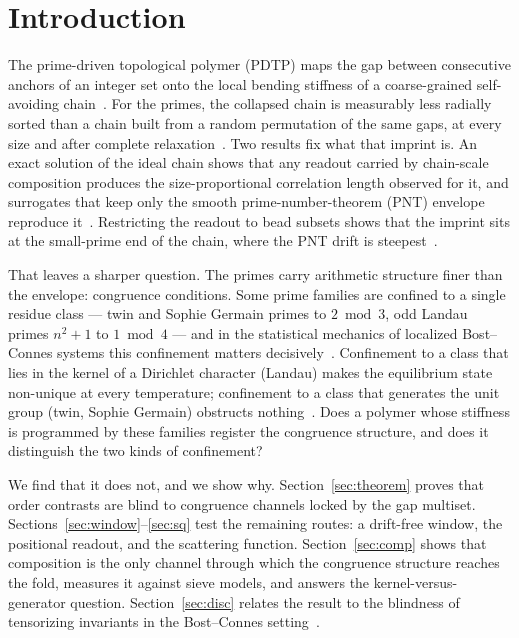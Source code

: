 \documentclass[reprint,amsmath,amssymb,aps,pre,longbibliography]{revtex4-2}
\begin{document}
\maketitle

\section{Introduction}

The prime-driven topological polymer (PDTP) maps the gap between consecutive anchors of an
integer set onto the local bending stiffness of a coarse-grained self-avoiding
chain~\cite{PDTP4}. For the primes, the collapsed chain is measurably less radially sorted than
a chain built from a random permutation of the same gaps, at every size and after complete
relaxation~\cite{PDTP4,Merged}. Two results fix what that imprint is. An exact solution of the
ideal chain shows that any readout carried by chain-scale composition produces the
size-proportional correlation length observed for it, and surrogates that keep only the smooth
prime-number-theorem (PNT) envelope reproduce it~\cite{Merged}. Restricting the readout to bead
subsets shows that the imprint sits at the small-prime end of the chain, where the PNT drift is
steepest~\cite{PDTP4}.

That leaves a sharper question. The primes carry arithmetic structure finer than the envelope:
congruence conditions. Some prime families are confined to a single residue class --- twin and
Sophie Germain primes to $2\bmod3$, odd Landau primes $n^2+1$ to $1\bmod4$ --- and in the
statistical mechanics of localized Bost--Connes systems this confinement matters
decisively~\cite{LBCS,BostConnes}. Confinement to a class that lies in the kernel of a Dirichlet
character (Landau) makes the equilibrium state non-unique at every temperature; confinement to a
class that generates the unit group (twin, Sophie Germain) obstructs nothing~\cite[Ch.~37]{LBCS}.
Does a polymer whose stiffness is programmed by these families register the congruence
structure, and does it distinguish the two kinds of confinement?

We find that it does not, and we show why. Section~\ref{sec:theorem} proves that order contrasts
are blind to congruence channels locked by the gap multiset. Sections~\ref{sec:window}--\ref{sec:sq}
test the remaining routes: a drift-free window, the positional readout, and the scattering
function. Section~\ref{sec:comp} shows that composition is the only channel through which the
congruence structure reaches the fold, measures it against sieve models, and answers the
kernel-versus-generator question. Section~\ref{sec:disc} relates the result to the blindness of
tensorizing invariants in the Bost--Connes setting~\cite[Ch.~4]{LBCS}.
\end{document}
